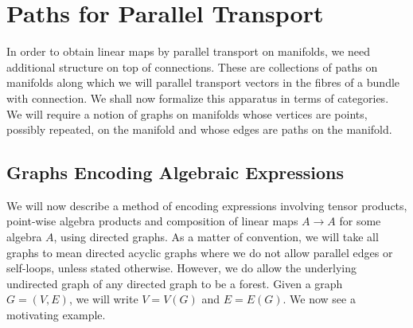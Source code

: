 \documentclass[./Thick_TQFTs_and_Quantum_Information.tex]{subfiles}
\begin{document}
\section{Paths for Parallel Transport}

In order to obtain linear maps by parallel transport on manifolds, we need
additional structure on top of connections. These are collections of paths on
manifolds along which we will parallel transport vectors in the fibres of a
bundle with connection. We shall now formalize this apparatus in terms of
categories. We will require a notion of graphs on manifolds whose vertices are
points, possibly repeated, on the manifold and whose edges are paths on the
manifold.

\subsection{Graphs Encoding Algebraic Expressions}\label{subsec:alg_graph_exp}

We will now describe a method of encoding expressions involving tensor products,
point-wise algebra products and composition of linear maps $A \to A$ for some
algebra $A$, using directed graphs. As a matter of convention, we will take all
graphs to mean directed acyclic graphs where we do not allow parallel edges or
self-loops, unless stated otherwise. However, we do allow the underlying
undirected graph of any directed graph to be a forest. Given a graph
$G = (V, E)$, we will write $V = V(G)$ and $E = E(G)$. We now see a motivating
example.
\end{document}
